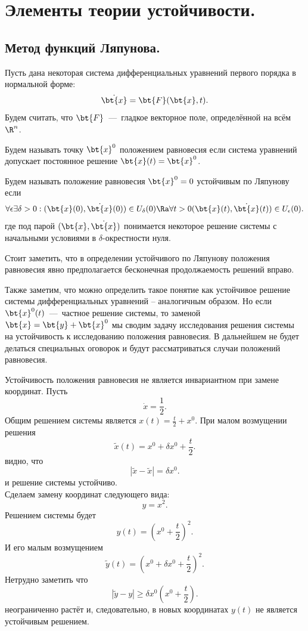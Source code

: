 \section{Элементы теории устойчивости.}
\subsection{Метод функций Ляпунова.}
Пусть дана некоторая система дифференциальных уравнений первого порядка в нормальной форме:
\begin{equation*}
    \dot{\bt{x}} = \bt{F}(\bt{x}, t).
\end{equation*}
Будем считать, что $\bt{F}$~---~гладкое векторное поле, определённой на всём $\R^n$.
\begin{definition}
    Будем называть точку $\bt{x}^0$ положением равновесия если система уравнений допускает постоянное решение $\bt{x}(t) = \bt{x}^0$.
\end{definition}
\begin{definition}
    Будем называть положение равновесия $\bt{x}^0 = 0$ устойчивым по Ляпунову если
    \[
        \forall \epsilon \exists \delta > 0: (\bt{x}(0), \dot{\bt{x}}(0)) \in U_\delta(0) \Ra \forall t > 0 (\bt{x}(t), \dot{\bt{x}}(t)) \in U_\epsilon(0).
    \]
    где под парой $(\bt{x}, \dot{\bt{x}})$ понимается некоторое решение системы с начальными условиями в $\delta$-окрестности нуля.
\end{definition}
\begin{note}
    Стоит заметить, что в определении устойчивого по Ляпунову положения равновесия явно предполагается бесконечная продолжаемость решений вправо.
\end{note}
\begin{note}
    Также заметим, что можно определить такое понятие как устойчивое решение системы дифференциальных уравнений -- аналогичным образом.
    Но если $\bt{x}^0(t)$~---~частное решение системы, то заменой $\bt{x} = \bt{y} + \bt{x}^0$ мы сводим задачу исследования решения системы на устойчивость к исследованию положения равновесия.
    В дальнейшем не будет делаться специальных оговорок и будут рассматриваться случаи положений равновесия.
\end{note}
\begin{note}
    Устойчивость положения равновесия не является инвариантном при замене координат.
    Пусть
    \[
        \dot{x} = \frac{1}{2}.
    \]
    Общим решением системы является $x(t) = \frac{t}{2} + x^0$.
    При малом возмущении решения
    \[
        \tilde{x}(t) = x^0 + \delta x^0 + \frac{t}{2}.
    \]
    видно, что
    \[
        |\tilde{x} - \tilde{x}| = \delta x^0.
    \]
    и решение системы устойчиво. \\
    Сделаем замену координат следующего вида:
    \[
        y = x^2.
    \]
    Решением системы будет
    \[
        y(t) = (x^0 + \frac{t}{2})^2.
    \]
    И его малым возмущением
    \[
        \tilde{y}(t) = (x^0 + \delta x^0 + \frac{t}{2})^2.
    \]
    Нетрудно заметить что
    \[
        |\tilde{y} - y| \geq \delta x^0 (x^0 + \frac{t}{2}).
    \]
    неограниченно растёт и, следовательно, в новых координатах $y(t)$ не является устойчивым решением.
\end{note}
